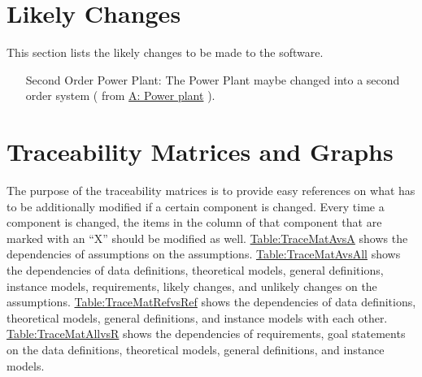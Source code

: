 \documentclass[12pt]{article}
\begin{document}
\section{Likely Changes}
\label{Sec:LCs}
This section lists the likely changes to be made to the software.

\begin{itemize}
\item[Second Order Power Plant:\phantomsection\label{likeChgIC}]{The Power Plant maybe changed into a second order system ( from  \hyperref[pwrPlant]{A: Power plant} ).}
\end{itemize}
\section{Traceability Matrices and Graphs}
\label{Sec:TraceMatrices}
The purpose of the traceability matrices is to provide easy references on what has to be additionally modified if a certain component is changed. Every time a component is changed, the items in the column of that component that are marked with an ``X'' should be modified as well. \hyperref[Table:TraceMatAvsA]{Table:TraceMatAvsA} shows the dependencies of assumptions on the assumptions. \hyperref[Table:TraceMatAvsAll]{Table:TraceMatAvsAll} shows the dependencies of data definitions, theoretical models, general definitions, instance models, requirements, likely changes, and unlikely changes on the assumptions. \hyperref[Table:TraceMatRefvsRef]{Table:TraceMatRefvsRef} shows the dependencies of data definitions, theoretical models, general definitions, and instance models with each other. \hyperref[Table:TraceMatAllvsR]{Table:TraceMatAllvsR} shows the dependencies of requirements, goal statements on the data definitions, theoretical models, general definitions, and instance models.
\end{document}
